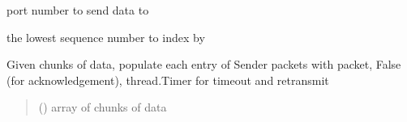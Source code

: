 \documentclass[letterpaper,10pt,oneside,english,openany]{sphinxmanual}
\begin{document}
\begin{fulllineitems}
\begin{fulllineitems}
\end{fulllineitems}


\begin{fulllineitems}
\label{\detokenize{modules:sender_rdt.Sender.port}}
\pysigstartsignatures
\pysigline
{}
\pysigstopsignatures
\sphinxAtStartPar
port number to send data to

\end{fulllineitems}


\begin{fulllineitems}
\label{\detokenize{modules:sender_rdt.Sender.base_seq}}
\pysigstartsignatures
\pysigline
{}
\pysigstopsignatures
\sphinxAtStartPar
the lowest sequence number to index by

\end{fulllineitems}


\begin{fulllineitems}
\label{\detokenize{modules:sender_rdt.Sender.arrange_pkts}}
\pysigstartsignatures
\pysiglinewithargsret
{}
{}
{}
\pysigstopsignatures
\sphinxAtStartPar
Given chunks of data, populate each entry of Sender packets with
packet, False (for acknowledgement), thread.Timer for timeout and retransmit
\begin{quote}\begin{description}
\sphinxAtStartPar
{} () \textendash{} array of chunks of data

\end{description}\end{quote}

\end{fulllineitems}



\end{fulllineitems}
\end{document}
